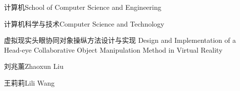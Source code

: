 
\school
{计算机}{School of Computer Science and Engineering}

\major
{计算机科学与技术}{Computer Science and Technology}

\thesistitle
{虚拟现实头眼协同对象操纵方法设计与实现}
{}
{Design and Implementation of a Head-eye Collaborative Object Manipulation Method in Virtual Reality}
{}

\thesisauthor
{刘兆薰}{Zhaoxun Liu}

\teacher
{王莉莉}{Lili Wang}






